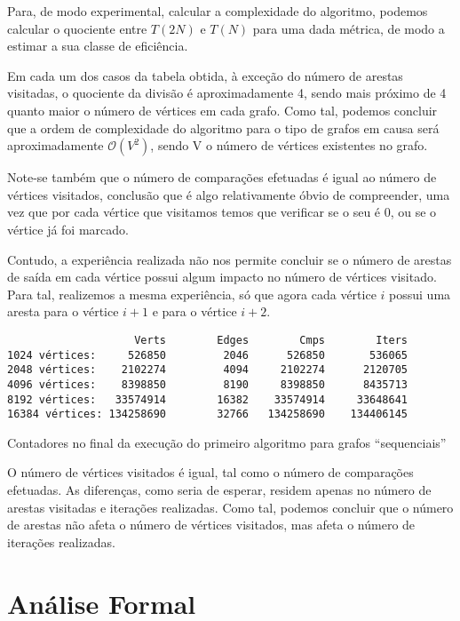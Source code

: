 Para, de modo experimental, calcular a complexidade do algoritmo,
podemos calcular o quociente entre $T(2N)$ e $T(N)$ para uma dada métrica,
de modo a estimar a sua classe de eficiência.

Em cada um dos casos da tabela obtida, à exceção do número de arestas
visitadas, o quociente da divisão é aproximadamente 4,
sendo mais próximo de 4 quanto maior o número de vértices em cada
grafo. Como tal, podemos concluir que
a ordem de complexidade do algoritmo para o tipo de grafos em
causa será aproximadamente $\mathcal{O}\left( V^2 \right)$, sendo V o número de
vértices existentes no grafo.

Note-se também que o número de comparações efetuadas é igual ao
número de vértices visitados, conclusão que é algo relativamente
óbvio de compreender, uma vez que por cada vértice que visitamos
temos que verificar se o seu  é 0, ou se o vértice
já foi marcado.

Contudo, a experiência realizada não nos permite concluir se o
número de arestas de saída em cada vértice possui algum impacto
no número de vértices visitado. Para tal, realizemos a mesma
experiência, só que agora cada vértice $i$ possui uma aresta para
o vértice $i + 1$ e para o vértice $i + 2$.

\begin{listing}[H]
	\centering
	\begin{verbatim}
                    Verts	     Edges	      Cmps        Iters
1024 vértices:     526850	      2046	    526850       536065
2048 vértices:    2102274	      4094	   2102274      2120705
4096 vértices:    8398850	      8190	   8398850      8435713
8192 vértices:   33574914	     16382	  33574914     33648641
16384 vértices: 134258690	     32766	 134258690    134406145
	\end{verbatim}
	\caption{Contadores no final da execução do primeiro algoritmo
		para grafos \enquote{sequenciais}}
	\label{1-3}
\end{listing}

O número de vértices visitados é igual, tal como o número de
comparações efetuadas. As diferenças, como seria de esperar, residem
apenas no número de arestas visitadas e iterações realizadas.
Como tal, podemos concluir que o número de arestas não afeta o número de
vértices visitados, mas afeta o número de iterações realizadas.

\section{Análise Formal}

